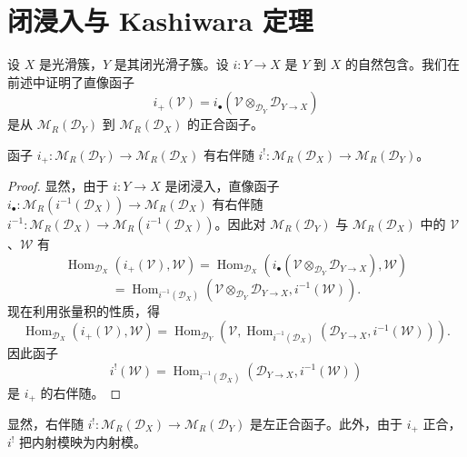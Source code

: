 \section{闭浸入与 Kashiwara 定理}

设 $X$ 是光滑簇，$Y$ 是其闭光滑子簇。设 $i:Y\to X$ 是 $Y$ 到 $X$ 的自然包含。我们在前述中证明了直像函子
$$i_+(\mathcal{V})=i_\bullet(\mathcal{V}\otimes_{\mathcal{D}_Y}\mathcal{D}_{Y\to X})$$
是从 $\mathcal{M}_R(\mathcal{D}_Y)$ 到 $\mathcal{M}_R(\mathcal{D}_X)$ 的正合函子。

\begin{proposition}\label{prop:4.8.1}
函子 $i_+:\mathcal{M}_R(\mathcal{D}_Y)\to\mathcal{M}_R(\mathcal{D}_X)$ 有右伴随
$i^!:\mathcal{M}_R(\mathcal{D}_X)\to\mathcal{M}_R(\mathcal{D}_Y)$。
\end{proposition}

\begin{proof}
显然，由于 $i:Y\to X$ 是闭浸入，直像函子
$i_\bullet:\mathcal{M}_R(i^{-1}(\mathcal{D}_X))\to\mathcal{M}_R(\mathcal{D}_X)$ 有右伴随
$i^{-1}:\mathcal{M}_R(\mathcal{D}_X)\to\mathcal{M}_R(i^{-1}(\mathcal{D}_X))$。因此对
$\mathcal{M}_R(\mathcal{D}_Y)$ 与 $\mathcal{M}_R(\mathcal{D}_X)$ 中的 $\mathcal{V}$、$\mathcal{W}$ 有
$$\operatorname{Hom}_{\mathcal{D}_X}(i_+(\mathcal{V}),\mathcal{W})
=\operatorname{Hom}_{\mathcal{D}_X}(i_\bullet(\mathcal{V}\otimes_{\mathcal{D}_Y}\mathcal{D}_{Y\to X}),\mathcal{W})$$
$$=\operatorname{Hom}_{i^{-1}(\mathcal{D}_X)}(\mathcal{V}\otimes_{\mathcal{D}_Y}\mathcal{D}_{Y\to X},i^{-1}(\mathcal{W})).$$
现在利用张量积的性质，得
$$\operatorname{Hom}_{\mathcal{D}_X}(i_+(\mathcal{V}),\mathcal{W})
=\operatorname{Hom}_{\mathcal{D}_Y}(\mathcal{V},
\operatorname{Hom}_{i^{-1}(\mathcal{D}_X)}(\mathcal{D}_{Y\to X},i^{-1}(\mathcal{W}))).$$
因此函子
$$i^!(\mathcal{W})=\operatorname{Hom}_{i^{-1}(\mathcal{D}_X)}(\mathcal{D}_{Y\to X},i^{-1}(\mathcal{W}))$$
是 $i_+$ 的右伴随。
\end{proof}

显然，右伴随 $i^!:\mathcal{M}_R(\mathcal{D}_X)\to\mathcal{M}_R(\mathcal{D}_Y)$ 是左正合函子。此外，由于 $i_+$ 正合，$i^!$ 把内射模映为内射模。


